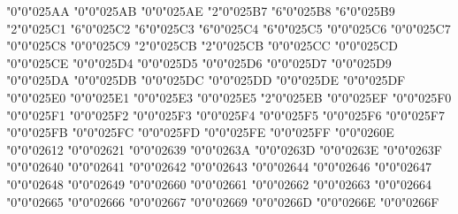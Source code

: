 \mchardef\smblksquare"0"0"025AA
\mchardef\smwhtsquare"0"0"025AB
\mchardef\vrectangleblack"0"0"025AE
\mchardef\triangleright"2"0"025B7
\mchardef\smallblacktriangleright"6"0"025B8
\mchardef\smalltriangleright"6"0"025B9
\mchardef\triangleleft"2"0"025C1
\mchardef\smallblacktriangleleft"6"0"025C2
\mchardef\smalltriangleleft"6"0"025C3
\mchardef\blackpointerleft"6"0"025C4
\mchardef\whitepointerleft"6"0"025C5
\mchardef\mdlgblkdiamond"0"0"025C6
\mchardef\mdlgwhtdiamond"0"0"025C7
\let\diamond\mdlgwhtdiamond
\mchardef\blackinwhitediamond"0"0"025C8
\mchardef\fisheye"0"0"025C9
\mchardef\mdlgwhtcircle"2"0"025CB
\let\bigcirc\mdlgwhtcircle
\mchardef\bigcirc"2"0"025CB
\mchardef\dottedcircle"0"0"025CC
\mchardef\circlevertfill"0"0"025CD
\mchardef\bullseye"0"0"025CE
\mchardef\circleurquadblack"0"0"025D4
\mchardef\blackcircleulquadwhite"0"0"025D5
\mchardef\blacklefthalfcircle"0"0"025D6
\mchardef\blackrighthalfcircle"0"0"025D7
\mchardef\inversewhitecircle"0"0"025D9
\mchardef\invwhiteupperhalfcircle"0"0"025DA
\mchardef\invwhitelowerhalfcircle"0"0"025DB
\mchardef\ularc"0"0"025DC
\mchardef\urarc"0"0"025DD
\mchardef\lrarc"0"0"025DE
\mchardef\llarc"0"0"025DF
\mchardef\topsemicircle"0"0"025E0
\mchardef\botsemicircle"0"0"025E1
\mchardef\llblacktriangle"0"0"025E3
\mchardef\urblacktriangle"0"0"025E5
\mchardef\boxbar"2"0"025EB
\mchardef\lgwhtcircle"0"0"025EF
\mchardef\squareulquad"0"0"025F0
\mchardef\squarellquad"0"0"025F1
\mchardef\squarelrquad"0"0"025F2
\mchardef\squareurquad"0"0"025F3
\mchardef\circleulquad"0"0"025F4
\mchardef\circlellquad"0"0"025F5
\mchardef\circlelrquad"0"0"025F6
\mchardef\circleurquad"0"0"025F7
\mchardef\mdwhtsquare"0"0"025FB
\mchardef\mdblksquare"0"0"025FC
\mchardef\mdsmwhtsquare"0"0"025FD
\mchardef\mdsmblksquare"0"0"025FE
\mchardef\lrtriangle"0"0"025FF
\mchardef\phone"0"0"0260E
\mchardef\XBox"0"0"02612
\mchardef\danger"0"0"02621
\mchardef\frownie"0"0"02639
\mchardef\smiley"0"0"0263A
\mchardef\rightmoon"0"0"0263D
\mchardef\leftmoon"0"0"0263E
\mchardef\mercury"0"0"0263F
\mchardef\female"0"0"02640
\mchardef\earth"0"0"02641
\mchardef\male"0"0"02642
\mchardef\jupiter"0"0"02643
\mchardef\saturn"0"0"02644
\mchardef\neptune"0"0"02646
\mchardef\pluto"0"0"02647
\mchardef\aries"0"0"02648
\mchardef\taurus"0"0"02649
\mchardef\spadesuit"0"0"02660
\mchardef\heartsuit"0"0"02661
\mchardef\diamondsuit"0"0"02662
\mchardef\clubsuit"0"0"02663
\mchardef\varspadesuit"0"0"02664
\mchardef\varheartsuit"0"0"02665
\mchardef\vardiamondsuit"0"0"02666
\mchardef\varclubsuit"0"0"02667
\mchardef\quarternote"0"0"02669
\mchardef\flat"0"0"0266D
\mchardef\natural"0"0"0266E
\mchardef\sharp"0"0"0266F
